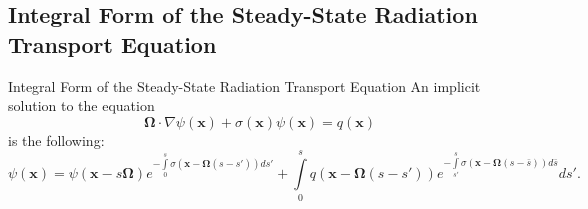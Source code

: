 \subsection{Integral Form of the Steady-State Radiation Transport Equation}
\begin{theorem}{Integral Form of the Steady-State Radiation Transport Equation}
   An implicit solution to the equation
   \begin{equation}\label{PDEss}
      \mathbf{\Omega}\cdot\nabla\psi(\mathbf{x})
      + \sigma(\mathbf{x})\psi(\mathbf{x}) = q(\mathbf{x})
   \end{equation}
   is the following:
   \begin{equation}\label{exactss}
      \psi(\mathbf{x}) = \psi(\mathbf{x} - s\mathbf{\Omega})
         e^{-\int\limits_0^s \sigma(\mathbf{x} - \mathbf{\Omega}(s -s'))ds'} +
         \int\limits_0^s q(\mathbf{x} - \mathbf{\Omega}(s -s'))
         e^{-\int\limits_{s'}^s\sigma(\mathbf{x}
         - \mathbf{\Omega}(s -\bar{s}))d\bar{s}} ds'.
   \end{equation}
\end{theorem}

